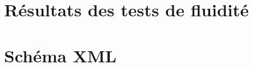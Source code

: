 \documentclass[paper=a4, fontsize=11pt]{article}
\newenvironment{changemargin}[2]{\begin{list}{}{%
      \setlength{\topsep}{0pt}%
      \setlength{\leftmargin}{0pt}%
      \setlength{\rightmargin}{0pt}%
      \setlength{\listparindent}{\parindent}%
      \setlength{\itemindent}{\parindent}%
      \setlength{\parsep}{0pt plus 1pt}%
      \addtolength{\leftmargin}{#1}%
      \addtolength{\rightmargin}{#2}%
    }\item }{\end{list}}
\numberwithin{equation}{section}		%
\numberwithin{figure}{section}			%
\numberwithin{table}{section}				%
\begin{document}
\begin{changemargin}{-1cm}{-1cm}
  \section{Résultats des tests de fluidité} \label{annexe:fluidite}
  

  \newpage

  \section{Schéma XML}
  


  \newpage

  
  

\end{changemargin}

\end{document}
